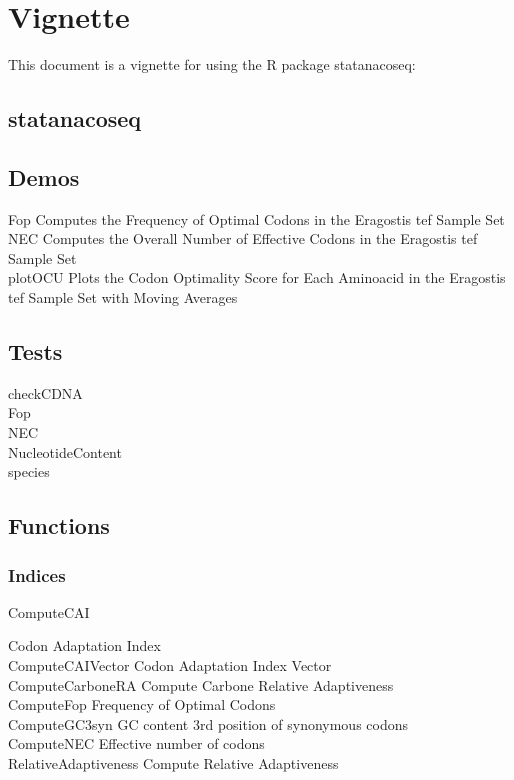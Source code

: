 \chapter{Vignette}
This document is a vignette for using the R package statanacoseq:


\section{statanacoseq}


\section{Demos}
Fop \quad Computes the Frequency of Optimal Codons in the Eragostis tef Sample Set \\
NEC \quad Computes the Overall Number of Effective Codons in the Eragostis tef Sample Set \\
plotOCU \quad Plots the Codon Optimality Score for Each Aminoacid in the Eragostis tef Sample Set with Moving Averages \\


\section{Tests}
checkCDNA \quad \\
Fop \quad \\
NEC \quad \\
NucleotideContent \quad \\
species \quad \\

\section{Functions}

\subsection{Indices}
\hypertarget{function:CAI}{ComputeCAI}	\quad Codon Adaptation Index \\
ComputeCAIVector \quad 	Codon Adaptation Index Vector \\
ComputeCarboneRA	\quad Compute Carbone Relative Adaptiveness \\
\hypertarget{function:Fop}{ComputeFop}	\quad Frequency of Optimal Codons \\
ComputeGC3syn	\quad GC content 3rd position of synonymous codons	 \\	%
\hypertarget{function:NEC}{ComputeNEC}	\quad Effective number of codons \\							%
\hypertarget{function:RA}{RelativeAdaptiveness}	\quad Compute Relative Adaptiveness	 \\			%

